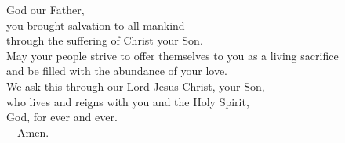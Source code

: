\prayer


\begin{prayerverse}
God our Father,\\
you brought salvation to all mankind\\
through the suffering of Christ your Son.\\
May your people strive to offer themselves to you as a living sacrifice\\
and be filled with the abundance of your love.\\
We ask this through our Lord Jesus Christ, your Son,\\
who lives and reigns with you and the Holy Spirit,\\
God, for ever and ever.\\
{\color{red}---\thinspace}Amen.
\end{prayerverse}

